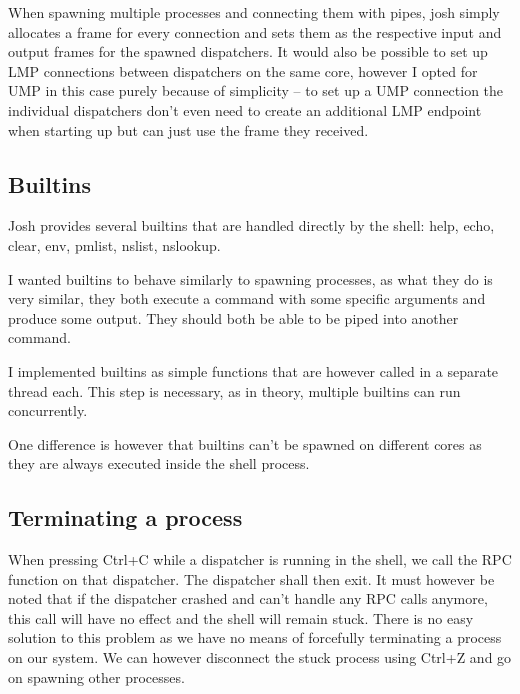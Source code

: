 When spawning multiple processes and connecting them with pipes, josh simply allocates a frame for
every connection and sets them as the respective input and output frames for the spawned dispatchers. It would also be possible to set up LMP connections between dispatchers on the same
core, however I opted for UMP in this case purely because of simplicity -- to set up a UMP connection
the individual dispatchers don't even need to create an additional LMP endpoint when starting up
but can just use the frame they received.

\subsection{Builtins}
Josh provides several builtins that are handled directly by the shell: help, echo, clear, env, pmlist, nslist, nslookup.

I wanted builtins to behave similarly to spawning processes, as what they do is very similar,
they both execute a command with some specific arguments and produce some output.
They should both be able to be piped into another command.

I implemented builtins as simple functions that are however called in a separate thread each.
This step is necessary, as in theory, multiple builtins can run concurrently.

One difference is however that builtins can't be spawned on different cores as they are always executed inside
the shell process.

\subsection{Terminating a process}
When pressing Ctrl+C while a dispatcher is running in the shell, we call the RPC function
 on that dispatcher. The dispatcher shall then exit. It must however be noted that if the dispatcher crashed and can't handle any RPC calls anymore, this call will
have no effect and the shell will remain stuck. There is no easy solution to this problem as
we have no means of forcefully terminating a process on our system. We can however disconnect
the stuck process using Ctrl+Z and go on spawning other processes.




